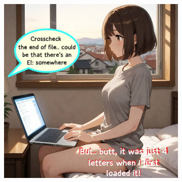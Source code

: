 \documentclass[a4paper, 18pt]{book} %
\begin{document}
 \begin{figure}[H]
  \centering
  \begin{subfigure}[b]{0.45\textwidth}
    \includegraphics[width=\textwidth]{resources/images/self_mod3.jpg}
  \end{subfigure}
  \hfill
  \begin{subfigure}[b]{0.45\textwidth}

\end{subfigure}
\end{figure}
\end{document}
